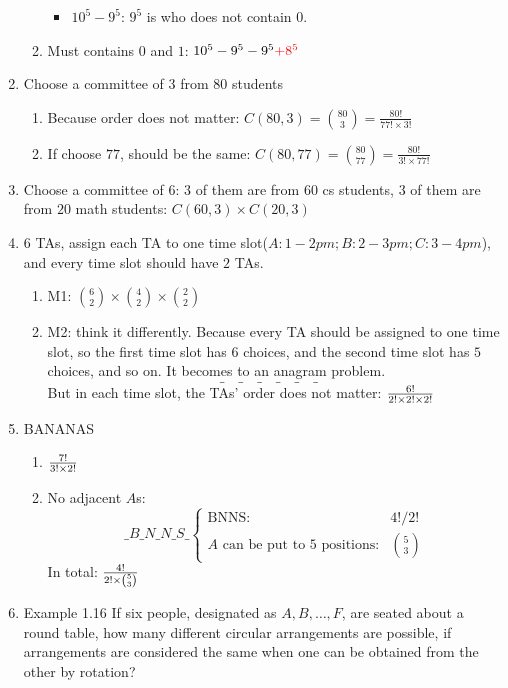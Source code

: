 \documentclass[letter]{book}
\begin{document}
\begin{enumerate}
\begin{enumerate}
\begin{itemize}
            \item $10^5 - 9^5$: $9^5$ is who does not contain $0$.
        \end{itemize}
        \item Must contains $0$ and $1$: $10^5-9^5-9^5\color{red}{+8^5}$
    \end{enumerate}
    \item Choose a committee of $3$ from $80$ students
    \begin{enumerate}
        \item Because order does not matter: $C(80,3)=\binom{80}{3}=\frac{80!}{77!\times 3!}$
        \item If choose $77$, should be the same: $C(80,77)=\binom{80}{77}=\frac{80!}{3!\times 77!}$
    \end{enumerate}
    \item Choose a committee of $6$: $3$ of them are from $60$ cs students, $3$ of them are from $20$ math students: $C(60,3)\times C(20,3)$
    \item $6$ TAs, assign each TA to one time slot($A: 1-2pm; B: 2-3pm; C:3-4pm$), and every time slot should have $2$ TAs.
    \begin{enumerate}
        \item M1: $\binom{6}{2} \times \binom{4}{2} \times \binom{2}{2}$
        \item M2: think it differently. Because every TA should be assigned to one time slot, so the first time slot has $6$ choices, and the second time slot has $5$ choices, and so on. It becomes to an anagram problem.
        $$
        \_\quad \_\quad \_\quad \_\quad \_\quad \_\quad
        $$
        But in each time slot, the TAs’ order does not matter: ${6!\over2!\times2!\times2!}$
    \end{enumerate}
    \item BANANAS
    \begin{enumerate}
        \item $7!\over3!\times2!$
        \item No adjacent $A$s:
        $$
        \_B\_N\_N\_S\_
         \begin{cases}
         \text{BNNS}:  & 4!/2! \\
         A \text{ can be put to 5 positions:} & \binom{5}{3}
         \end{cases}
        $$
        In total: $4!\over2! \times\binom{5}{3}$
    \end{enumerate}
    \item Example 1.16 If six people, designated as $A,B,\ldots,F$, are seated about a round table, how many different circular arrangements are possible, if arrangements are considered the same when one can be obtained from the other by rotation?\\

\end{enumerate}
\end{document}
